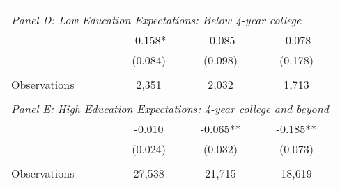 {\begin{tabular}{lccc}
&  &  &   \\
\multicolumn{4}{l}{\textit{Panel D: Low Education Expectations: Below 4-year college}} \\
\hspace{3mm}        &      -0.158*  &      -0.085   &      -0.078   \\
                    &     (0.084)   &     (0.098)   &     (0.178)   \\
                    &               &               &               \\
\hspace{3mm}Observations&       2,351   &       2,032   &       1,713   \\
 
&  &  &   \\
\multicolumn{4}{l}{\textit{Panel E: High Education Expectations: 4-year college and beyond}} \\
\hspace{3mm}        &      -0.010   &      -0.065** &      -0.185** \\
                    &     (0.024)   &     (0.032)   &     (0.073)   \\
                    &               &               &               \\
\hspace{3mm}Observations&      27,538   &      21,715   &      18,619   \\
 

\bottomrule
\end{tabular}
}
